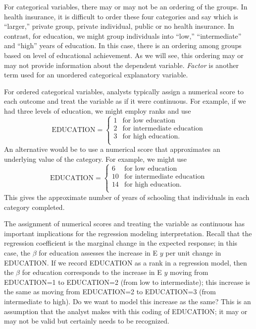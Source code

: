 \noindent For categorical variables, there may or may not be an
ordering of the groups. In health insurance, it is difficult to
order these four categories and say which is ``larger,'' private
group, private individual, public or no health insurance. In
contrast, for education, we might group individuals into ``low,''
``intermediate'' and ``high'' years of education. In this case,
there is an ordering among groups based on level of educational
achievement. As we will see, this ordering may or may not
provide information about the dependent variable. \textit{Factor} is
another term used for an unordered categorical explanatory variable.


For ordered categorical variables, analysts typically assign a
numerical score to each outcome and treat the variable as if it were
continuous. For example, if we had three levels of education, we
might employ ranks and use
\begin{equation*}
\textrm{EDUCATION} = \left\{ \begin{array}{cl}
        1           & \textrm{for low education} \\
        2           & \textrm{for intermediate education} \\
        3           & \textrm{for high education.} \\
\end{array} \right.
\end{equation*}
An alternative would be to use a numerical score that approximates
an underlying value of the category. For example, we might use
\begin{equation*}
\textrm{EDUCATION} = \left\{ \begin{array}{cl}
        6           & \textrm{for low education} \\
        10           & \textrm{for intermediate education} \\
        14           & \textrm{for high education.} \\
\end{array} \right.
\end{equation*}
This gives the approximate number of years of schooling that
individuals in each category completed.


The assignment of numerical scores and treating the variable as
continuous has important implications for the regression modeling
interpretation. Recall that the regression coefficient is the
marginal change in the expected response; in this case, the $\beta$
for education assesses the increase in E $y$ per unit change in
EDUCATION. If we record EDUCATION as a rank in a regression model,
then the $\beta$ for education corresponds to the increase in E $y$
moving from EDUCATION=1 to EDUCATION=2 (from low to intermediate);
this increase is the same as moving from EDUCATION=2 to EDUCATION=3
(from intermediate to high). Do we want to model this increase as
the same? This is an assumption that the analyst makes with this
coding of EDUCATION; it may or may not be valid but certainly needs
to be recognized.

